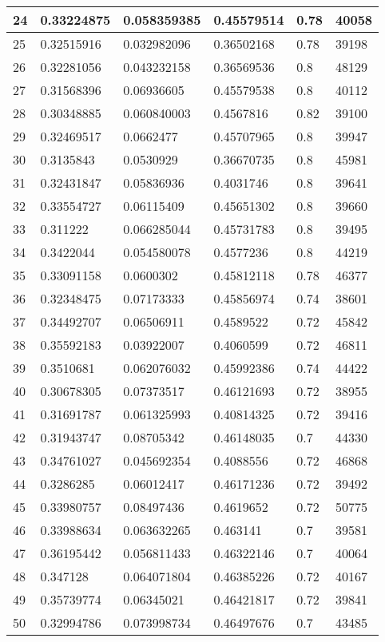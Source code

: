 \begin{longtable}{|l|l|l|l|l|l|}
24 & 0.33224875 & 0.058359385 & 0.45579514 & 0.78 & 40058 \\ \hline 
25 & 0.32515916 & 0.032982096 & 0.36502168 & 0.78 & 39198 \\ \hline 
26 & 0.32281056 & 0.043232158 & 0.36569536 & 0.8 & 48129 \\ \hline 
27 & 0.31568396 & 0.06936605 & 0.45579538 & 0.8 & 40112 \\ \hline 
28 & 0.30348885 & 0.060840003 & 0.4567816 & 0.82 & 39100 \\ \hline 
29 & 0.32469517 & 0.0662477 & 0.45707965 & 0.8 & 39947 \\ \hline 
30 & 0.3135843 & 0.0530929 & 0.36670735 & 0.8 & 45981 \\ \hline 
31 & 0.32431847 & 0.05836936 & 0.4031746 & 0.8 & 39641 \\ \hline 
32 & 0.33554727 & 0.06115409 & 0.45651302 & 0.8 & 39660 \\ \hline 
33 & 0.311222 & 0.066285044 & 0.45731783 & 0.8 & 39495 \\ \hline 
34 & 0.3422044 & 0.054580078 & 0.4577236 & 0.8 & 44219 \\ \hline 
35 & 0.33091158 & 0.0600302 & 0.45812118 & 0.78 & 46377 \\ \hline 
36 & 0.32348475 & 0.07173333 & 0.45856974 & 0.74 & 38601 \\ \hline 
37 & 0.34492707 & 0.06506911 & 0.4589522 & 0.72 & 45842 \\ \hline 
38 & 0.35592183 & 0.03922007 & 0.4060599 & 0.72 & 46811 \\ \hline 
39 & 0.3510681 & 0.062076032 & 0.45992386 & 0.74 & 44422 \\ \hline 
40 & 0.30678305 & 0.07373517 & 0.46121693 & 0.72 & 38955 \\ \hline 
41 & 0.31691787 & 0.061325993 & 0.40814325 & 0.72 & 39416 \\ \hline 
42 & 0.31943747 & 0.08705342 & 0.46148035 & 0.7 & 44330 \\ \hline 
43 & 0.34761027 & 0.045692354 & 0.4088556 & 0.72 & 46868 \\ \hline 
44 & 0.3286285 & 0.06012417 & 0.46171236 & 0.72 & 39492 \\ \hline 
45 & 0.33980757 & 0.08497436 & 0.4619652 & 0.72 & 50775 \\ \hline 
46 & 0.33988634 & 0.063632265 & 0.463141 & 0.7 & 39581 \\ \hline 
47 & 0.36195442 & 0.056811433 & 0.46322146 & 0.7 & 40064 \\ \hline 
48 & 0.347128 & 0.064071804 & 0.46385226 & 0.72 & 40167 \\ \hline 
49 & 0.35739774 & 0.06345021 & 0.46421817 & 0.72 & 39841 \\ \hline 
50 & 0.32994786 & 0.073998734 & 0.46497676 & 0.7 & 43485 \\ \hline 
\end{longtable}